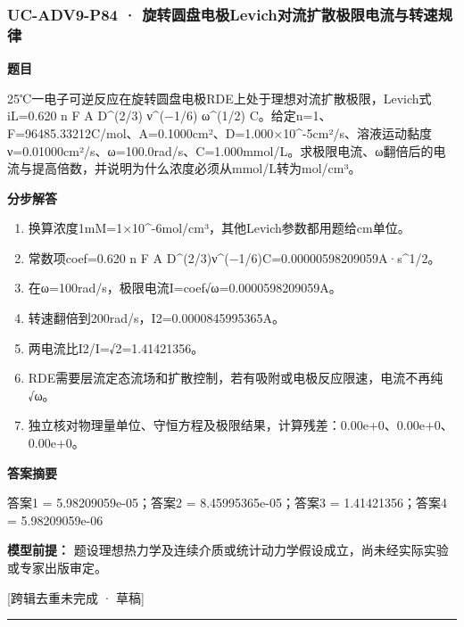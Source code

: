 \documentclass[UTF8,11pt,a4paper]{ctexart}
\begin{document}
\subsubsection*{UC-ADV9-P84 · 旋转圆盘电极Levich对流扩散极限电流与转速规律}
\noindent\textbf{题目}\par
25℃一电子可逆反应在旋转圆盘电极RDE上处于理想对流扩散极限，Levich式iL=0.620 n F A D\textasciicircum{}(2/3) ν\textasciicircum{}(−1/6) ω\textasciicircum{}(1/2) C。给定n=1、F=96485.33212C/mol、A=0.1000cm²、D=1.000×10\textasciicircum{}-5cm²/s、溶液运动黏度ν=0.01000cm²/s、ω=100.0rad/s、C=1.000mmol/L。求极限电流、ω翻倍后的电流与提高倍数，并说明为什么浓度必须从mmol/L转为mol/cm³。\par
\medskip\noindent\textbf{分步解答}
\begin{enumerate}
\item 换算浓度1mM=1×10\textasciicircum{}-6mol/cm³，其他Levich参数都用题给cm单位。
\item 常数项coef=0.620 n F A D\textasciicircum{}(2/3)ν\textasciicircum{}(−1/6)C=0.00000598209059A·s\textasciicircum{}1/2。
\item 在ω=100rad/s，极限电流I=coef√ω=0.0000598209059A。
\item 转速翻倍到200rad/s，I2=0.0000845995365A。
\item 两电流比I2/I=√2=1.41421356。
\item RDE需要层流定态流场和扩散控制，若有吸附或电极反应限速，电流不再纯√ω。
\item 独立核对物理量单位、守恒方程及极限结果，计算残差：0.00e+0、0.00e+0、0.00e+0。
\end{enumerate}
\noindent\textbf{答案摘要}\par
答案1 = 5.98209059e-05；答案2 = 8.45995365e-05；答案3 = 1.41421356；答案4 = 5.98209059e-06\par
\noindent\textbf{模型前提：}
题设理想热力学及连续介质或统计动力学假设成立，尚未经实际实验或专家出版审定。\par
\noindent\textcolor{red!65!black}{[跨辑去重未完成 · 草稿]} \par
\medskip\hrule\medskip
{}
\end{document}

